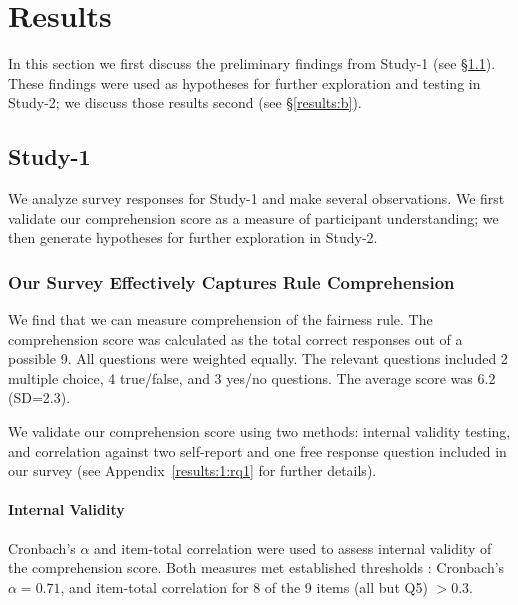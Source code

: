 \documentclass{article}
\newcommand{\studyA}{Study-1}
\newcommand{\studyB}{Study-2}
\newcommand{\Appref}[1]{Appendix~\ref{#1}}
\begin{document}
\section{Results}\label{sec:results}

In this section we first discuss the preliminary findings from \studyA{} (see \S\ref{results:a}). These findings were used as hypotheses for further exploration and testing in \studyB{}; we discuss those results second (see \S\ref{results:b}). 




\subsection{\studyA{}} \label{results:a}
We analyze survey responses for \studyA{} and make several observations. We first validate our comprehension score as a measure of participant understanding; we then generate hypotheses for further exploration in \studyB{}.

\subsubsection{Our Survey Effectively Captures Rule Comprehension} \label{results:a:validity}

We find that we can measure comprehension of the fairness rule. The comprehension score was calculated as the total correct responses out of a possible 9. All questions were weighted equally. The relevant questions included 2 multiple choice, 4 true/false, and 3 yes/no questions. The average score was 6.2 (SD=2.3).

We validate our comprehension score using two methods: internal validity testing, and correlation against two self-report and one free response question included in our survey (see \Appref{results:1:rq1} for further details).

\vspace{-5pt}

\paragraph{Internal Validity}
Cronbach's $\alpha$ and item-total correlation were used to assess internal validity of the comprehension score. Both measures met established thresholds \cite{nunnally1978,everitt2010}: Cronbach's $\alpha = 0.71$, and item-total correlation for 8 of the 9 items (all but Q5) $> 0.3$. 

\vspace{-5pt}
\end{document}
